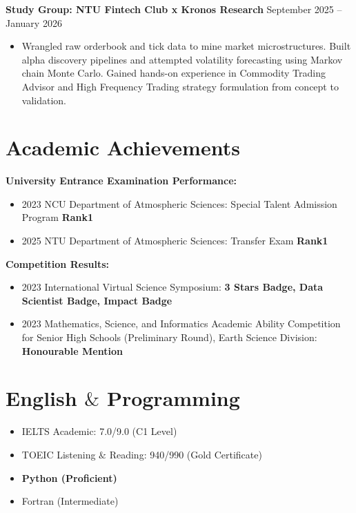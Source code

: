 \documentclass[11pt,a4paper]{article}
\newcommand{\cvitem}[2]{\noindent\textbf{#1} \hfill #2}
\begin{document}
\vspace{2pt}

\cvitem{Study Group: NTU Fintech Club x Kronos Research}{September 2025 -- January 2026}
\begin{itemize}[leftmargin=15pt, itemsep=0pt, parsep=0pt, topsep=0pt, partopsep=0pt]
\small\linespread{0.85}\selectfont
    \item Wrangled raw orderbook and tick data to mine market microstructures. Built alpha discovery pipelines and attempted volatility forecasting using Markov chain Monte Carlo. Gained hands-on experience in Commodity Trading Advisor and High Frequency Trading strategy formulation from concept to validation.
\end{itemize}

\vspace{6pt}

\section{Academic Achievements}

\noindent\textbf{University Entrance Examination Performance:}
\begin{itemize}[leftmargin=15pt,itemsep=2pt,topsep=2pt]
    \item 2023 NCU Department of Atmospheric Sciences: Special Talent Admission Program \textbf{Rank1}
    \item 2025 NTU Department of Atmospheric Sciences: Transfer Exam \textbf{Rank1}
\end{itemize}

\vspace{2pt}

\noindent\textbf{Competition Results:}
\begin{itemize}[leftmargin=15pt,itemsep=2pt,topsep=2pt]
    \item 2023 International Virtual Science Symposium: \textbf{3 Stars Badge, Data Scientist Badge, Impact Badge}
    \item 2023 Mathematics, Science, and Informatics Academic Ability Competition for Senior High Schools
    (Preliminary Round), Earth Science Division: \textbf{Honourable Mention}
\end{itemize}

\vspace{6pt}

\section{English $\&$ Programming}
\linespread{0.95}\selectfont
\begin{itemize}[leftmargin=15pt,itemsep=2pt,topsep=2pt]
    \item IELTS Academic: 7.0/9.0 (C1 Level)
    \item TOEIC Listening $\&$ Reading: 940/990 (Gold Certificate)
    \item \textbf{Python (Proficient)}
    \item Fortran (Intermediate)
\end{itemize}

\vspace{6pt}
\end{document}
